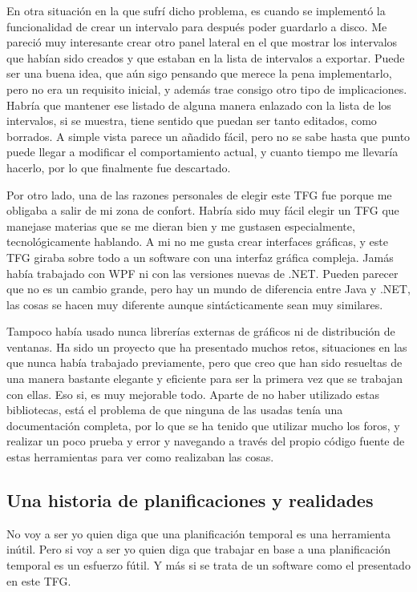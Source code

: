 En otra situaci\'on en la que sufr\'i dicho problema, es cuando se implement\'o la funcionalidad de crear un intervalo
para despu\'es poder guardarlo a disco. Me pareci\'o muy interesante crear otro panel lateral en el que mostrar los intervalos 
que hab\'ian sido creados y que estaban en la lista de intervalos a exportar. Puede ser una buena idea, que a\'un sigo pensando
que merece la pena implementarlo, pero no era un requisito inicial, y adem\'as trae consigo otro tipo de implicaciones. 
Habr\'ia que mantener ese listado de alguna manera enlazado con la lista de los intervalos, si se muestra, tiene sentido
que puedan ser tanto editados, como borrados. A simple vista parece un a\~nadido f\'acil, pero no se sabe hasta que punto
puede llegar a modificar el comportamiento actual, y cuanto tiempo me llevar\'ia hacerlo, por lo que finalmente
fue descartado.

Por otro lado, una de las razones personales de elegir este TFG fue porque me obligaba a salir de mi zona
de confort. Habr\'ia sido muy f\'acil elegir un TFG que manejase materias que se me dieran bien
y me gustasen especialmente, tecnol\'ogicamente hablando. A mi no me gusta crear interfaces gr\'aficas,
y este TFG giraba sobre todo a un software con una interfaz gr\'afica compleja. Jam\'as hab\'ia trabajado
con WPF ni con las versiones nuevas de .NET. Pueden parecer que no es un cambio grande, pero hay un mundo de
diferencia entre Java y .NET, las cosas se hacen muy diferente aunque sint\'acticamente sean muy similares.

Tampoco hab\'ia usado nunca librer\'ias externas de gr\'aficos ni de distribuci\'on de ventanas. Ha sido
un proyecto que ha presentado muchos retos, situaciones en las que nunca hab\'ia trabajado previamente,
pero que creo que han sido resueltas de una manera bastante elegante y eficiente para ser
la primera vez que se trabajan con ellas. Eso si, es muy mejorable todo. Aparte
de no haber utilizado estas bibliotecas, est\'a el problema de que ninguna de las usadas
ten\'ia una documentaci\'on completa, por lo que se ha tenido que utilizar mucho los foros,
y realizar un poco prueba y error y navegando a trav\'es del propio c\'odigo
fuente de estas herramientas para ver como realizaban las cosas.

\subsection{Una historia de planificaciones y realidades}
No voy a ser yo quien diga que una planificaci\'on temporal es una herramienta in\'util.
Pero si voy a ser yo quien diga que trabajar en base a una planificaci\'on temporal es
un esfuerzo f\'util. Y m\'as si se trata de un software como el presentado
en este TFG.

